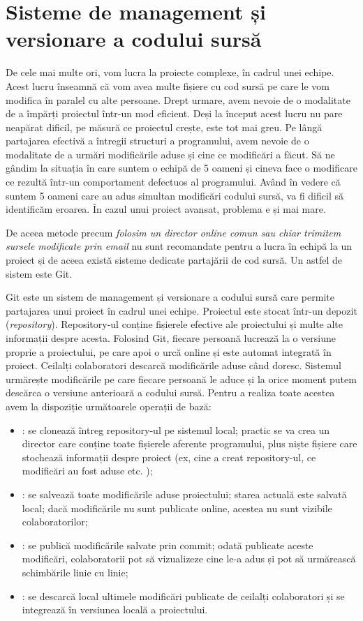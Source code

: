 \section{Sisteme de management și versionare a codului sursă}
\label{sec:appdev-versioning}

De cele mai multe ori, vom lucra la proiecte complexe, în cadrul unei echipe.
Acest lucru înseamnă că vom avea multe fișiere cu cod sursă pe care le vom modifica în
paralel cu alte persoane. Drept urmare, avem nevoie de o modalitate de a împărți
proiectul într-un mod eficient. Deși la început acest lucru nu pare neapărat
dificil, pe măsură ce proiectul crește, este tot mai greu. Pe lângă partajarea
efectivă a întregii structuri a programului, avem nevoie de o modalitate de a
urmări modificările aduse și cine ce modificări a făcut. Să ne gândim la
situația în care suntem o echipă de 5 oameni și cineva face o modificare ce
rezultă într-un comportament defectuos al programului. Având în vedere că suntem
5 oameni care au adus simultan modificări codului sursă, va fi dificil să
identificăm eroarea. În cazul unui proiect avansat, problema e și mai mare.

De aceea metode precum \textit{folosim un director online comun sau chiar
trimitem sursele modificate prin email} nu sunt recomandate pentru a lucra în
echipă la un proiect și de aceea există sisteme dedicate partajării de cod
sursă. Un astfel de sistem este Git.

Git este un sistem de management și versionare a codului sursă care permite
partajarea unui proiect în cadrul unei echipe. Proiectul este stocat într-un
depozit (\textit{repository}). Repository-ul conține fișierele efective ale proiectului și
multe alte informații despre acesta. Folosind Git, fiecare persoană lucrează la
o versiune proprie a proiectului, pe care apoi o urcă online și este automat
integrată în proiect. Ceilalți colaboratori descarcă modificările aduse când
doresc. Sistemul urmărește modificările pe care fiecare persoană le aduce și la
orice moment putem descărca o versiune anterioară a codului sursă. Pentru a
realiza toate acestea avem la dispoziție următoarele operații de bază:

\begin{itemize}
  \item {}: se clonează întreg repository-ul pe sistemul local;
		practic se va crea un director care conține toate fișierele
		aferente programului, plus niște fișiere care stochează
		informații despre proiect (ex, cine a creat repository-ul, ce
		modificări au fost aduse etc. );
  \item {}: se salvează toate modificările aduse proiectului; starea
		actuală este salvată local; dacă modificările nu sunt publicate
		online, acestea nu sunt vizibile colaboratorilor;
  \item {}: se publică modificările salvate prin commit; odată
		publicate aceste modificări, colaboratorii pot să vizualizeze
		cine le-a adus și pot să urmărească schimbările linie cu linie;
  \item {}: se descarcă local ultimele modificări publicate de ceilalți
		colaboratori și se integrează în versiunea locală a proiectului.
\end{itemize}

